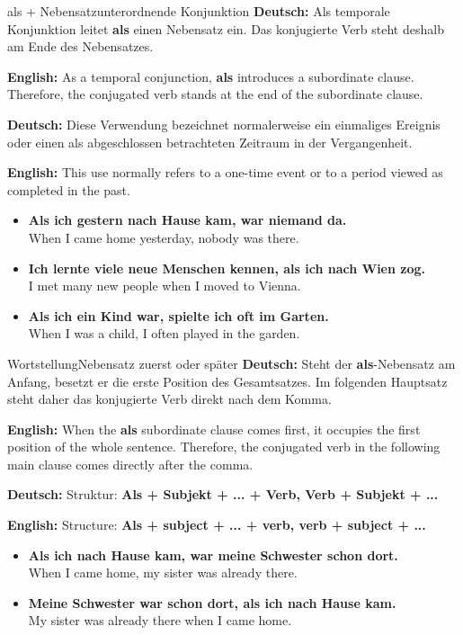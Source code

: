 \documentclass[a4paper,11pt]{article}
\newcommand{\GermanText}[1]{\textbf{Deutsch: }#1\par}
\newcommand{\EnglishText}[1]{{\small\color{SoftGray}\textbf{English: }#1\par}}
\newcommand{\ExampleItem}[2]{\item \textbf{#1}\\{\small\color{SoftGray}#2}}
\begin{document}
        \begin{grammarentry}{als + Nebensatz}{unterordnende Konjunktion}
            \GermanText{Als temporale Konjunktion leitet \textbf{als} einen Nebensatz ein. Das konjugierte Verb steht deshalb am Ende des Nebensatzes.}
            \EnglishText{As a temporal conjunction, \textbf{als} introduces a subordinate clause. Therefore, the conjugated verb stands at the end of the subordinate clause.}

            \GermanText{Diese Verwendung bezeichnet normalerweise ein einmaliges Ereignis oder einen als abgeschlossen betrachteten Zeitraum in der Vergangenheit.}
            \EnglishText{This use normally refers to a one-time event or to a period viewed as completed in the past.}
        \end{grammarentry}

        \begin{exbox}
            \begin{itemize}
                \ExampleItem{Als ich gestern nach Hause kam, war niemand da.}{When I came home yesterday, nobody was there.}
                \ExampleItem{Ich lernte viele neue Menschen kennen, als ich nach Wien zog.}{I met many new people when I moved to Vienna.}
                \ExampleItem{Als ich ein Kind war, spielte ich oft im Garten.}{When I was a child, I often played in the garden.}
            \end{itemize}
        \end{exbox}

        \begin{grammarentry}{Wortstellung}{Nebensatz zuerst oder später}
            \GermanText{Steht der \textbf{als}-Nebensatz am Anfang, besetzt er die erste Position des Gesamtsatzes. Im folgenden Hauptsatz steht daher das konjugierte Verb direkt nach dem Komma.}
            \EnglishText{When the \textbf{als} subordinate clause comes first, it occupies the first position of the whole sentence. Therefore, the conjugated verb in the following main clause comes directly after the comma.}

            \GermanText{Struktur: \textbf{Als + Subjekt + ... + Verb, Verb + Subjekt + ...}}
            \EnglishText{Structure: \textbf{Als + subject + ... + verb, verb + subject + ...}}
        \end{grammarentry}

        \begin{exbox}
            \begin{itemize}
                \ExampleItem{Als ich nach Hause kam, war meine Schwester schon dort.}{When I came home, my sister was already there.}
                \ExampleItem{Meine Schwester war schon dort, als ich nach Hause kam.}{My sister was already there when I came home.}
            \end{itemize}
        \end{exbox}
\end{document}
